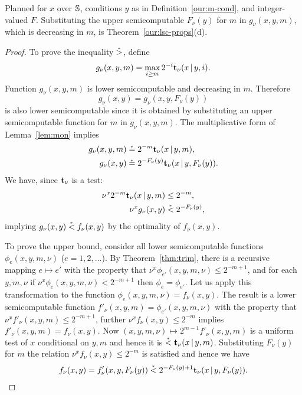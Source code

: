 \begin{formalization}
Planned for $x$ over $\mathbb{S}$, conditions $y$ as in Definition~\ref{our:m-cond}, and integer-valued
$F$. Substituting the upper semicomputable $F_{\nu}(y)$ for $m$ in $g_{\nu}(x,y,m)$, which is
decreasing in $m$, is Theorem~\ref{our:lsc-props}(d).
\end{formalization}
 \begin{proof}
  To prove the inequality $\stackrel{{}_*}{>}$, define
 \[
   g_{\nu}(x,y,m) =\max_{i\ge m}2^{-i}\mathbf{t}_{\nu}(x \,\vert\, y, i).
 \]
  Function $g_{\nu}(x,y,m)$ is lower semicomputable and decreasing
in $m$.
Therefore 
 \[
  g_{\nu}(x,y)  = g_{\nu}(x,y,F_{\nu}(y))
 \]
is also lower semicomputable since it is obtained by substituting an
upper semicomputable function for $m$ in $g_{\nu}(x,y,m)$.
The multiplicative form of Lemma~\ref{lem:mon} implies
 \begin{align*}
       g_{\nu}(x,y,m) &\stackrel{{}_*}{=} 2^{-m}\mathbf{t}_{\nu}(x \,\vert\, y, m),
\\   g_{\nu}(x,y) &\stackrel{{}_*}{=} 2^{-F_{\nu}(y)}\mathbf{t}_{\nu}(x \,\vert\, y, F_{\nu}(y)).
 \end{align*}
We have, since $\mathbf{t}_{\nu}$ is a test:
 \begin{align*}
   \nu^{x}2^{-m}\mathbf{t}_{\nu}(x \,\vert\, y, m) &\le 2^{-m},
\\   \nu^{x}g_{\nu}(x,y) &\stackrel{{}_*}{<} 2^{-F_{\nu}(y)},
 \end{align*}
implying $g_{\nu}(x,y)\stackrel{{}_*}{<} f_{\nu}(x,y)$ by the optimality of $f_{\nu}(x,y)$.

To prove the upper bound, consider all lower semicomputable functions
$\phi_{e}(x,y,m,\nu)$ ($e=1,2,\dots$).
By Theorem~\ref{thm:trim}, there is a recursive mapping $e\mapsto e'$ with the
property that $\nu^{x}\phi_{e'}(x,y,m,\nu)\le 2^{-m+1}$, and for each $y,m,\nu$ if
$\nu^{x}\phi_{e}(x,y,m,\nu)< 2^{-m+1}$ then $\phi_{e}=\phi_{e'}$.
Let us apply this transformation to the function
$\phi_{e}(x,y,m,\nu)=f_{\nu}(x,y)$.
The result is a lower semicomputable function 
$f'_{\nu}(x,y,m)=\phi_{e'}(x,y,m,\nu)$
with the property that $\nu^{x}f'_{\nu}(x,y,m)\le 2^{-m+1}$, further
$\nu^{x}f_{\nu}(x,y)\le 2^{-m}$ implies $f'_{\nu}(x,y,m)=f_{\nu}(x,y)$.
Now $(x,y,m,\nu)\mapsto 2^{m-1}f'_{\nu}(x,y,m)$ is a uniform test
of $x$ conditional on $y,m$ and hence it is $\stackrel{{}_*}{<}\mathbf{t}_{\nu}(x \,\vert\, y, m)$.
Substituting $F_{\nu}(y)$ for $m$ the relation
$\nu^{x}f_{\nu}(x,y)\le 2^{-m}$ is satisfied and hence we have
 \begin{align*}
 f_{\nu}(x,y) =
 f'_{\nu}(x,y,F_{\nu}(y)) \stackrel{{}_*}{<} 2^{-F_{\nu}(y)+1}\mathbf{t}_{\nu}(x\,\vert\, y,F_{\nu}(y)).
 \end{align*}
 \end{proof}

